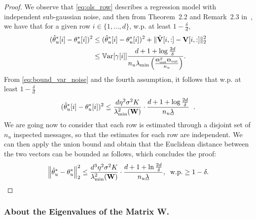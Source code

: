 \begin{proof}
We observe that \eqref{eq:ols_row} describes a regression model with independent sub-gaussian noise, and then from Theorem~2.2 and Remark~2.3 in~\cite{mitlecture}, we have that for a given row $i\in \{1, \dots, d\}$, w.p. at least $ 1-\frac{\delta}{d}$, 
\begin{align}\label{eq:expected_error_row_wise}
    (\hat {\theta}^*_u[i]-\theta_u^*[i])^2
    & \le (\hat {\theta}^*_u[i]-\theta_u^*[i])^2 + \lVert \hat{\mathbf{V}}[i,:] - \mathbf{V}[i,:] \rVert_2^2\nonumber\\
    & \le \mathbb{V}\mathrm{ar}[\mathbf{\gamma}[i]] \frac{d + 1 + \log{\frac{2d}{\delta}} }{n_u \lambda_{\min}\left(\frac{\Theta_{\text{out}}^{T} \Theta_{\text{out}}}{n_u}\right)}. \;\; \nonumber
\end{align}
From \eqref{eq:bound_var_noise} and the fourth assumption, it follows that w.p. at least $1-\frac{\delta}{ d}$
\begin{equation}\label{eq:expected_error_row_wise2}
   (\hat {\theta}^*_u[i]-\theta_u^*[i])^2
    \le \frac{d\eta^2 \sigma^2 K}{\lambda_{\text{min}}^2(\mathbf{W})} \cdot \frac{d + 1 + \log{\frac{2 d}{\delta}} }{n_u \underline{\lambda}}\;\; .
\end{equation}
We are going now to consider that each row is estimated through a disjoint set of $n_u$ inspected messages, so that the estimates for each row are independent. We can then apply the union bound and obtain that the Euclidean  distance between the two vectors can be bounded as follows, which concludes the proof:
\begin{equation}\label{eq:bounds_w_v}
 \left\lVert \hat{\theta}^*_u - \theta_u^* \right\rVert_2^2
    \leq \frac{d^3 \eta^2 \sigma^2 K}{\lambda_{\text{min}}^2(\mathbf{W})} \cdot \frac{d+1+\ln \frac{2 d}{\delta}}{n_u \underline{\lambda}}, \;\; \text{w.p.} \ge 1 - \delta.
\end{equation}
\end{proof}

\subsubsection{About the Eigenvalues of the Matrix W.}

